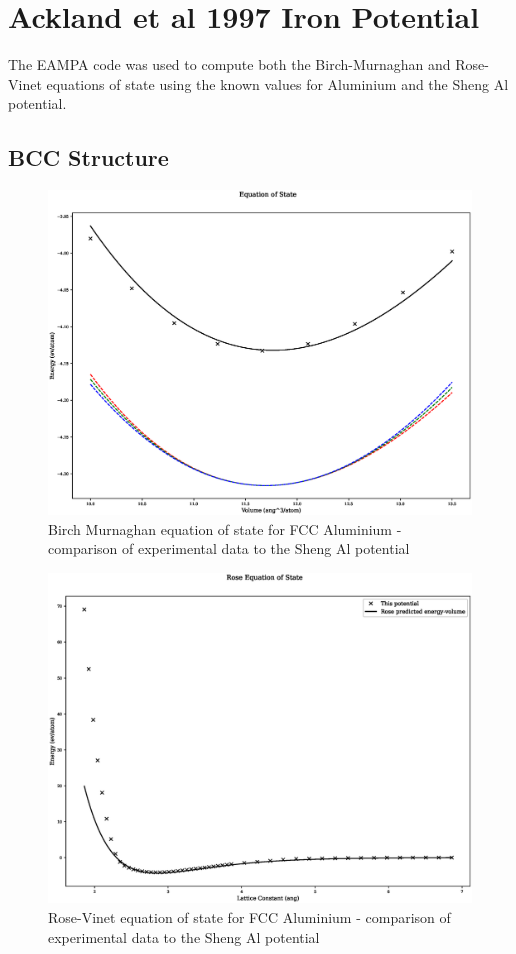 \section{Ackland et al 1997 Iron Potential}

The EAMPA code was used to compute both the Birch-Murnaghan and Rose-Vinet equations of state using the known values for Aluminium and the Sheng Al potential\cite{Fe_abch}.  

\subsection{BCC Structure}
 
\begin{figure}
  \begin{center}
    \includegraphics[width=0.6\linewidth]{appendix/transferability/transferability/Fe_mhsasa/equation_of_state_bp_bcc.eps}
  \end{center}
	\caption{Birch Murnaghan equation of state for FCC Aluminium - comparison of experimental data to the Sheng Al potential}
	\label{fig:shengalfccbm}
\end{figure}

\begin{figure}
  \begin{center}
    \includegraphics[width=0.6\linewidth]{appendix/transferability/transferability/Fe_mhsasa/rose_plot_bp_bcc.eps}
  \end{center}
	\caption{Rose-Vinet equation of state for FCC Aluminium - comparison of experimental data to the Sheng Al potential}
	\label{fig:shengalfccbm}
\end{figure}

